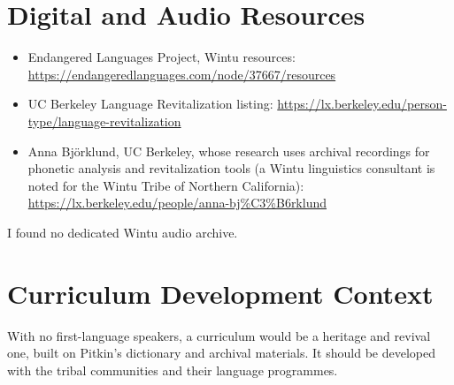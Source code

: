 \documentclass[12pt]{article}
\begin{document}
\section{Digital and Audio Resources}
\begin{itemize}
\item Endangered Languages Project, Wintu resources: \url{https://endangeredlanguages.com/node/37667/resources}
\item UC Berkeley Language Revitalization listing: \url{https://lx.berkeley.edu/person-type/language-revitalization}
\item Anna Bj\"orklund, UC Berkeley, whose research uses archival recordings for phonetic analysis and revitalization tools (a Wintu linguistics consultant is noted for the Wintu Tribe of Northern California): \url{https://lx.berkeley.edu/people/anna-bj%C3%B6rklund}
\end{itemize}
I found no dedicated Wintu audio archive.

\section{Curriculum Development Context}
With no first-language speakers, a curriculum would be a heritage and revival one, built on Pitkin's dictionary and archival materials. It should be developed with the tribal communities and their language programmes.
\end{document}
